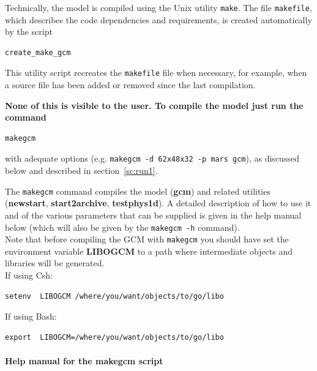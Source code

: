 \label{sc:compil1}
Technically, the model is compiled using the Unix utility {\tt make}.
The file {\tt makefile}, which describes the code dependencies
and requirements,
is created automatically by the script
\begin{verbatim}
create_make_gcm
\end{verbatim}
This utility script recreates the {\tt makefile} file when necessary,
for example, when a source file has been added or removed since the last
compilation.

{\bf None of this is visible to the user.
To compile the model just run the command}
\begin{verbatim}
makegcm
\end{verbatim}
with adequate options (e.g. {\tt makegcm -d 62x48x32 -p mars gcm}), as
discussed below and described in section~\ref{sc:run1}.


The {\tt makegcm} command compiles the model ({\bf gcm}) and related utilities
({\bf newstart}, {\bf start2archive}, {\bf testphys1d}).
A detailed description of how to use it and of the various parameters that
can be supplied
is given in the help manual below
(which will also be given by the \verb+makegcm -h+ command).\\
Note that before compiling the GCM with {\tt makegcm} you should have set
the environment variable {\bf LIBOGCM} to a path where intermediate
objects and libraries will be generated.\\
If using Csh:
\begin{verbatim}
setenv  LIBOGCM /where/you/want/objects/to/go/libo
\end{verbatim}
If using Bash:
\begin{verbatim}
export  LIBOGCM=/where/you/want/objects/to/go/libo
\end{verbatim}
\paragraph{Help manual for the makegcm script}

